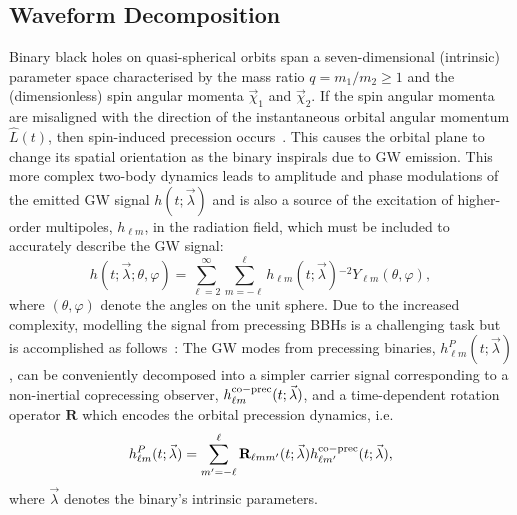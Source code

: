 \documentclass[prd,amssymb,amsmath,amsfonts,superscriptaddress,nofootinbib,reprint,showpacs, longbibliography]{revtex4-1}
\begin{document}
\subsection{Waveform Decomposition}
\label{subsec:WaveformDecomposition}
Binary black holes on quasi-spherical orbits span a seven-dimensional (intrinsic) parameter space characterised by the mass ratio $q=m_1/m_2 \geq 1$ and the (dimensionless) spin angular momenta $\vec{\chi}_1$ and $\vec{\chi}_2$.  
If the spin angular momenta are misaligned with the direction of the instantaneous orbital angular momentum $\hat{L}(t)$, then spin-induced precession occurs~\cite{Apostolatos:1994mx,Kidder:1995zr}. This causes the orbital plane to change its spatial orientation as the binary inspirals due to GW emission. This more complex two-body dynamics leads to amplitude and phase modulations of the emitted GW signal $h(t; \vec{\lambda})$ and is also a source of the excitation of higher-order multipoles, $h_{\ell m}$, in the radiation field, which must be included to accurately describe the GW signal:
\begin{equation}
    h(t; \vec{\lambda}; \theta, \varphi) = \sum_{\ell=2}^\infty \sum_{m=-\ell}^\ell h_{\ell m}(t; \vec{\lambda}) {}^{-2}Y_{\ell m}(\theta, \varphi),
    \label{eq:strain}
\end{equation}
where $(\theta, \varphi)$ denote the angles on the unit sphere. Due to the increased complexity, modelling the signal from precessing BBHs is a challenging task but is accomplished as follows~\cite{Apostolatos:1994mx, Buonanno:2002fy, Schmidt:2010it, Schmidt:2012rh}: 
The GW modes from precessing binaries, $h^P_{\ell m}(t;\vec{\lambda})$, can be conveniently decomposed into a simpler carrier signal corresponding to a non-inertial coprecessing observer, $h^{\rm co-prec}_{\ell m}(t;\vec{\lambda})$, and a time-dependent rotation operator $\mathbf{R}$ which encodes the orbital precession dynamics, i.e.
\begin{equation}
    h^P_{\ell m}(t; \vec{\lambda}) = \sum_{m'= -\ell}^{\ell} \mathbf{R}_{\ell m m'}(t; \vec{\lambda}) h^{\rm co-prec}_{\ell m'}(t; \vec{\lambda}),
\label{eq:modes}
\end{equation}
where $\vec{\lambda}$ denotes the binary's intrinsic parameters. 
\end{document}
